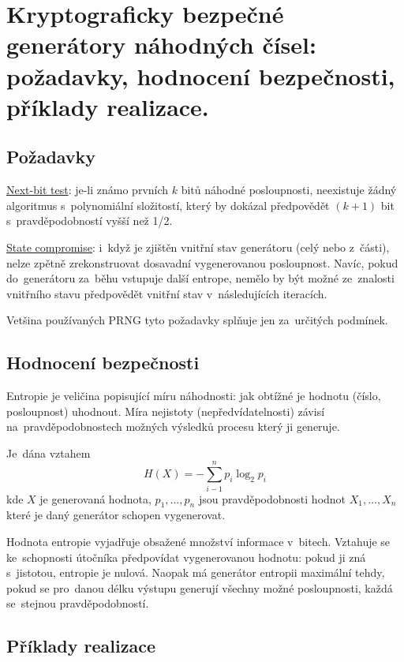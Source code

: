 \clearpage
\section{Kryptograficky bezpečné generátory náhodných čísel: požadavky, hodnocení bezpečnosti, příklady realizace.}

\subsection{Požadavky}

\uline{Next-bit test}: je-li známo prvních $k$ bitů náhodné posloupnosti, neexistuje žádný algoritmus s~polynomiální složitostí, který by dokázal předpovědět $(k + 1)$ bit s~pravděpodobností vyšší než 1/2.

\uline{State compromise}: i~když je zjištěn vnitřní stav generátoru (celý nebo z~části), nelze zpětně zrekonstruovat dosavadní vygenerovanou posloupnost.
Navíc, pokud do~generátoru za~běhu vstupuje další entrope, nemělo by být možné ze~znalosti vnitřního stavu předpovědět vnitřní stav v~následujících iteracích.

Vetšina používaných PRNG tyto požadavky splňuje jen za~určitých podmínek.

\subsection{Hodnocení bezpečnosti}

Entropie je veličina popisující míru náhodnosti: jak obtížné je hodnotu (číslo, posloupnost) uhodnout.
Míra nejistoty (nepředvídatelnosti) závisí na~pravděpodobnostech možných výsledků procesu který ji generuje.

Je~dána vztahem
$$H(X) = -\sum_{i-1}^n p_{i} \log_2 p_{i}$$
kde
$X$ je generovaná hodnota,
$p_1, \dots, p_n$ jsou pravděpodobnosti hodnot $X_1, \dots, X_n$ které je daný generátor schopen vygenerovat.

Hodnota entropie vyjadřuje obsažené množství informace v~bitech.
Vztahuje se ke~schopnosti útočníka předpovídat vygenerovanou hodnotu: pokud ji zná s~jistotou, entropie je nulová.
Naopak má generátor entropii maximální tehdy, pokud se pro~danou délku výstupu generují všechny možné posloupnosti, každá se~stejnou pravděpodobností.



\subsection{Příklady realizace}

